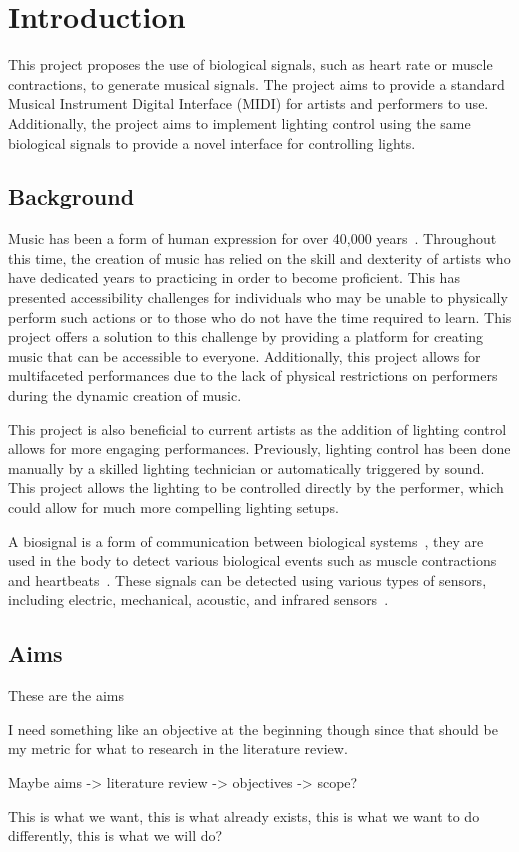 \chapter{Introduction}
This project proposes the use of biological signals, such as heart rate or muscle contractions, to generate musical signals.
The project aims to provide a standard Musical Instrument Digital Interface (MIDI) for artists and performers to use.
Additionally, the project aims to implement lighting control using the same biological signals to provide a novel interface for controlling lights.

\section{Background}
Music has been a form of human expression for over 40,000 years~\cite{killin:2018}.
Throughout this time, the creation of music has relied on the skill and dexterity of artists
who have dedicated years to practicing in order to become proficient.
This has presented accessibility challenges for individuals who may be unable to physically perform such actions
or to those who do not have the time required to learn.
This project offers a solution to this challenge by providing a platform for creating music that can be accessible to everyone.
Additionally, this project allows for multifaceted performances due to the lack of physical restrictions on performers
during the dynamic creation of music.

This project is also beneficial to current artists as the addition of lighting control allows for more engaging performances.
Previously, lighting control has been done manually by a skilled lighting technician or automatically triggered by sound.
This project allows the lighting to be controlled directly by the performer, which could allow for much more compelling lighting setups.


A biosignal is a form of communication between biological systems~\cite{semmlow:2018},
they are used in the body to detect various biological events such as muscle contractions and heartbeats~\cite{escabí:2012}.
These signals can be detected using various types of sensors, including electric, mechanical, acoustic, and infrared sensors~\cite{kaniusas:2012}.

\section{Aims}
These are the aims

I need something like an objective at the beginning though since that should be my metric
for what to research in the literature review.

Maybe aims -> literature review -> objectives -> scope?

This is what we want, this is what already exists, this is what we want to do differently,
this is what we will do?

